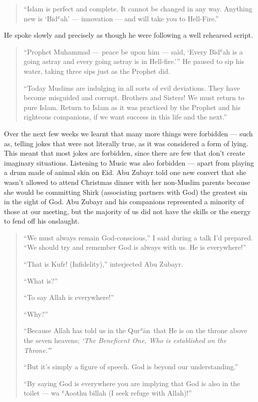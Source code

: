 \documentclass[12pt]{memoir}
\def\´{ʾ} %
\def\`{ʿ} %
\newcommand{\cor}[2]{#2} %
\def \Quran{Qur\-\´ān} %
\def\–{-\hskip0pt}
\begin{document}
\begin{quote}
“Islam is perfect and complete.
It cannot be changed in any way.
Anything new is ‘Bid\`ah’ — innovation — and will take you to Hell-Fire.”
\end{quote}

He spoke slowly and precisely
as though he were following a well rehearsed script.

\begin{quote}
“Prophet Muhammad — peace be upon him — said,
‘Every Bid\`ah is a going astray and every going astray is in Hell-fire.’”
He paused to sip his water, taking three sips just as the Prophet did.

“Today Muslims are indulging in all sorts of evil deviations.
They have become misguided and corrupt.
Brothers and Sisters!
We must return to pure Islam.
Return to Islam as it was practiced by the Prophet
and his righteous companions,
if we want success in this life and the next.”
\end{quote}

Over the next few weeks we learnt that many more things were forbidden —
such as, telling jokes that were not literally true,
as it was considered a form of lying.
This meant that most jokes are forbidden,
since there are few that don’t create imaginary situations.
Listening to Music was also forbidden —
apart from playing a drum made of animal skin on Eid.
Abu \cor{Zubair}{Zubayr} told one new convert that she wasn’t allowed
to attend Christmas dinner with her non-Muslim parents
because she would be committing Shirk (associating partners with God)
the greatest sin in the sight of God.
Abu Zubayr and his companions represented a minority of those at our meeting,
but the majority of us did not have the skills
or the energy to fend off his onslaught.

\begin{quote}
“We must always remain God\–conscious,”
I said during a talk I’d prepared.
“We should try and remember God is always with us. He is everywhere!”

“That is Kufr! (Infidelity),” interjected Abu Zubayr.

“What is?”

“To say Allah is everywhere!”

“Why?”

“Because Allah has told us in the \Quran\
that He is on the throne above the seven heavens;
\emph{‘The Beneficent One, Who is established on the Throne.’}”

“But it’s simply a figure of speech.
God is beyond our understanding.”

“By saying God is everywhere you are implying that God is also in the toilet —
wa \`Aoothu billah (I seek refuge with Allah)!”
\end{quote}
\end{document}
